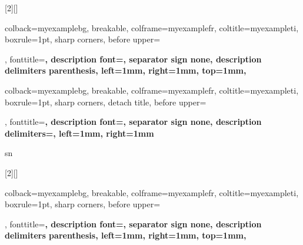 [2][]{%
    colback=myexamplebg, 
    breakable, 
    colframe=myexamplefr, 
    coltitle=myexampleti, 
    boxrule=1pt, 
    sharp corners, 
    before upper={\renewcommand{\familydefault}{\sfdefault}\selectfont\tcbtitle\par\smallskip}, 
    fonttitle=\bfseries\sffamily, 
    description font=\mdseries, 
    separator sign none, 
    description delimiters parenthesis, 
    left=1mm, %
    right=1mm, %
    top=1mm,
}

{colback=myexamplebg, breakable, colframe=myexamplefr, coltitle=myexampleti, 
 boxrule=1pt, sharp corners, detach title, 
 before upper={\renewcommand{\familydefault}{\sfdefault}\selectfont\tcbtitle\par\smallskip}, 
 fonttitle=\bfseries\sffamily, description font=\mdseries, 
 separator sign none, description delimiters={}, %
 left=1mm, %
 right=1mm %
}{sn}


[2][]{%
    colback=myexamplebg, 
    breakable, 
    colframe=myexamplefr, 
    coltitle=myexampleti, 
    boxrule=1pt, 
    sharp corners, 
    before upper={\renewcommand{\familydefault}{\sfdefault}\selectfont\tcbtitle\par\smallskip}, 
    fonttitle=\bfseries\sffamily, 
    description font=\mdseries, 
    separator sign none, 
    description delimiters parenthesis, 
    left=1mm, %
    right=1mm, %
    top=1mm,
}

\newcommand{\thm}[3][]{\begin{Theorem}{#2}{#1}#3\end{Theorem}}
\newcommand{\cor}[3][]{\begin{corollary}{#2}{#1}#3\end{corollary}}
\newcommand{\lem}[3][]{\begin{lemma}{#2}{#1}#3\end{lemma}}
\newcommand{\clm}[3][]{\begin{claim}{#2}{#1}#3\end{claim}}
\newcommand{\ex}[3][]{\begin{Example}{#2}{#1}#3\end{Example}}
\newcommand{\hl}[2][]{\begin{highlightbox}{#1}#2\end{highlightbox}}
\newcommand{\sn}[3][]{\begin{sidenotebox}{#2}{#1}#3\end{sidenotebox}}
\newcommand{\sns}[3][]{\begin{sidenoteboxsmall}{#2}{#1}#3\end{sidenoteboxsmall}}
\newcommand{\hls}[2][]{\begin{highlightboxsmall}{#1}#2\end{highlightboxsmall}}


